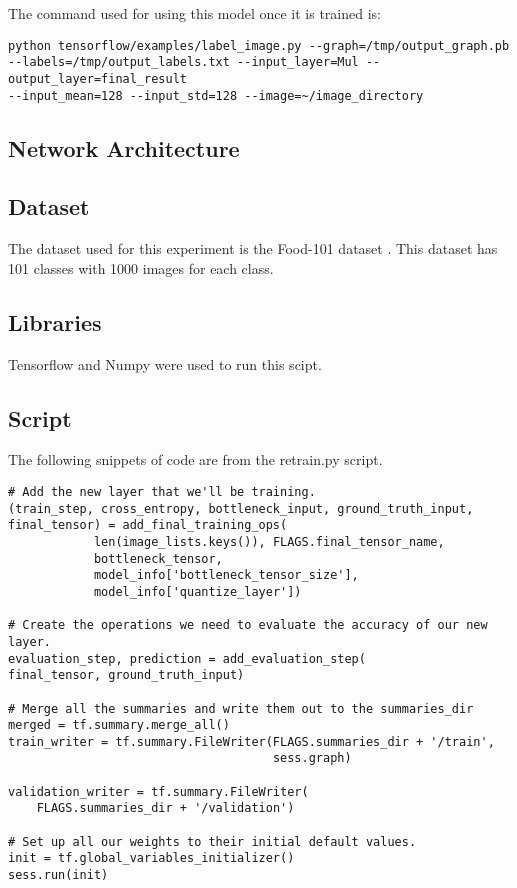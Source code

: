 The command used for using this model once it is trained is:
\begin{lstlisting}
python tensorflow/examples/label_image.py --graph=/tmp/output_graph.pb
--labels=/tmp/output_labels.txt --input_layer=Mul --output_layer=final_result
--input_mean=128 --input_std=128 --image=~/image_directory
\end{lstlisting}

\subsection*{Network Architecture}

\subsection*{Dataset}
The dataset used for this experiment is the Food-101 dataset \parencite{food
101}. This dataset has 101 classes with 1000 images for each class.

\subsection*{Libraries}
Tensorflow and Numpy were used to run this scipt.

\subsection*{Script}
The following snippets of code are from the retrain.py script.

\begin{lstlisting}[style=Python]
# Add the new layer that we'll be training.
(train_step, cross_entropy, bottleneck_input, ground_truth_input,
final_tensor) = add_final_training_ops(
            len(image_lists.keys()), FLAGS.final_tensor_name,
            bottleneck_tensor,
            model_info['bottleneck_tensor_size'],
            model_info['quantize_layer'])
 
# Create the operations we need to evaluate the accuracy of our new layer.
evaluation_step, prediction = add_evaluation_step(
final_tensor, ground_truth_input)
 
# Merge all the summaries and write them out to the summaries_dir
merged = tf.summary.merge_all()
train_writer = tf.summary.FileWriter(FLAGS.summaries_dir + '/train',
                                     sess.graph)
 
validation_writer = tf.summary.FileWriter(
    FLAGS.summaries_dir + '/validation')
 
# Set up all our weights to their initial default values.
init = tf.global_variables_initializer()
sess.run(init)

\end{lstlisting}




